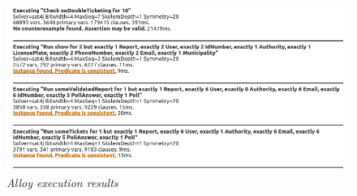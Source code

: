 \begin{figure}
  \centering
  \includegraphics[width=\textwidth,height=.95\textheight,keepaspectratio]{RASD_Images/AlloyWorlds/executionResults.jpg}
  \caption{\textit{Alloy execution results}}
\end{figure}
\newpage
